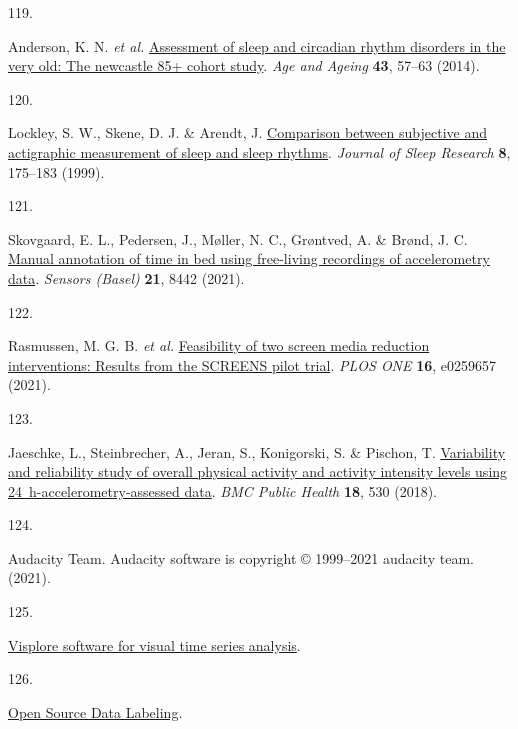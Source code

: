 \documentclass[
  10pt,
]{scrbook}
\newlength{\cslhangindent}
\newlength{\csllabelwidth}
\newlength{\cslentryspacingunit} %
\newenvironment{CSLReferences}[2] %
 {%
  \setlength{\parindent}{0pt}
  \ifodd #1
  \let\oldpar\par
  \def\par{\hangindent=\cslhangindent\oldpar}
  \fi
  \setlength{\parskip}{#2\cslentryspacingunit}
 }%
 {}
\newcommand{\CSLLeftMargin}[1]{\parbox[t]{\csllabelwidth}{#1}}
\newcommand{\CSLRightInline}[1]{\parbox[t]{\linewidth - \csllabelwidth}{#1}\break}
\let\originaltextbf\textbf
\renewcommand{\textbf}[1]{\textcolor{color1}{\textsf{\originaltextbf{#1}}}}
\begin{document}
\begin{CSLReferences}{0}{0}
\leavevmode{}%
\CSLLeftMargin{119. }%
\CSLRightInline{Anderson, K. N. \emph{et al.}
\href{https://doi.org/10.1093/ageing/aft153}{Assessment of sleep and
circadian rhythm disorders in the very old: The newcastle 85+ cohort
study}. \emph{Age and Ageing} \textbf{43}, 57--63 (2014).}

\leavevmode{}%
\CSLLeftMargin{120. }%
\CSLRightInline{Lockley, S. W., Skene, D. J. \& Arendt, J.
\href{https://doi.org/10.1046/j.1365-2869.1999.00155.x}{Comparison
between subjective and actigraphic measurement of sleep and sleep
rhythms}. \emph{Journal of Sleep Research} \textbf{8}, 175--183 (1999).}

\leavevmode{}%
\CSLLeftMargin{121. }%
\CSLRightInline{Skovgaard, E. L., Pedersen, J., Møller, N. C., Grøntved,
A. \& Brønd, J. C. \href{https://doi.org/10.3390/s21248442}{Manual
annotation of time in bed using free-living recordings of accelerometry
data}. \emph{Sensors (Basel)} \textbf{21}, 8442 (2021).}

\leavevmode{}%
\CSLLeftMargin{122. }%
\CSLRightInline{Rasmussen, M. G. B. \emph{et al.}
\href{https://doi.org/10.1371/journal.pone.0259657}{Feasibility of two
screen media reduction interventions: Results from the {SCREENS} pilot
trial}. \emph{{PLOS} {ONE}} \textbf{16}, e0259657 (2021).}

\leavevmode{}%
\CSLLeftMargin{123. }%
\CSLRightInline{Jaeschke, L., Steinbrecher, A., Jeran, S., Konigorski,
S. \& Pischon, T.
\href{https://doi.org/10.1186/s12889-018-5415-8}{Variability and
reliability study of overall physical activity and activity intensity
levels using 24~h-accelerometry-assessed data}. \emph{{BMC} Public
Health} \textbf{18}, 530 (2018).}

\leavevmode{}%
\CSLLeftMargin{124. }%
\CSLRightInline{Audacity Team. Audacity\textregistered{} software is
copyright © 1999--2021 audacity team. (2021).}

\leavevmode{}%
\CSLLeftMargin{125. }%
\CSLRightInline{\href{https://visplore.com/home-11-2022/}{Visplore
{\textendash} software for visual time series analysis}.}

\leavevmode{}%
\CSLLeftMargin{126. }%
\CSLRightInline{\href{https://labelstud.io/}{Open Source Data
Labeling}.}


\end{CSLReferences}
\end{document}
